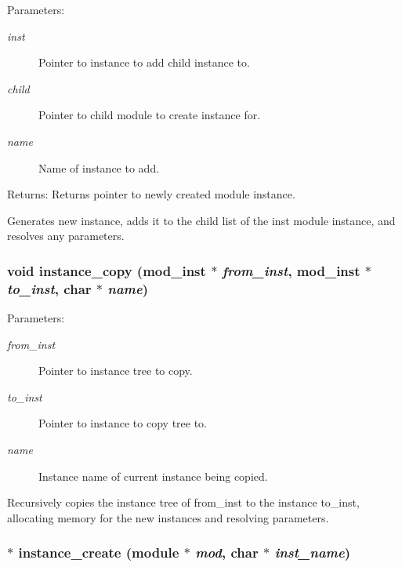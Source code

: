 \begin{Desc}
\item[Parameters:]
\begin{description}
\item[{\em inst}]Pointer to instance to add child instance to. \item[{\em child}]Pointer to child module to create instance for. \item[{\em name}]Name of instance to add.\end{description}
\end{Desc}
\begin{Desc}
\item[Returns:]Returns pointer to newly created module instance.\end{Desc}
Generates new instance, adds it to the child list of the inst module instance, and resolves any parameters. 
\subsubsection{\setlength{\rightskip}{0pt plus 5cm}void instance\_\-copy ({\bf mod\_\-inst} $\ast$ {\em from\_\-inst}, {\bf mod\_\-inst} $\ast$ {\em to\_\-inst}, char $\ast$ {\em name})}\label{instance_8c_a7}


\begin{Desc}
\item[Parameters:]
\begin{description}
\item[{\em from\_\-inst}]Pointer to instance tree to copy. \item[{\em to\_\-inst}]Pointer to instance to copy tree to. \item[{\em name}]Instance name of current instance being copied.\end{description}
\end{Desc}
Recursively copies the instance tree of from\_\-inst to the instance to\_\-inst, allocating memory for the new instances and resolving parameters. 
\subsubsection{$\ast$ instance\_\-create ({\bf module} $\ast$ {\em mod}, char $\ast$ {\em inst\_\-name})}\label{instance_8c_a0}



